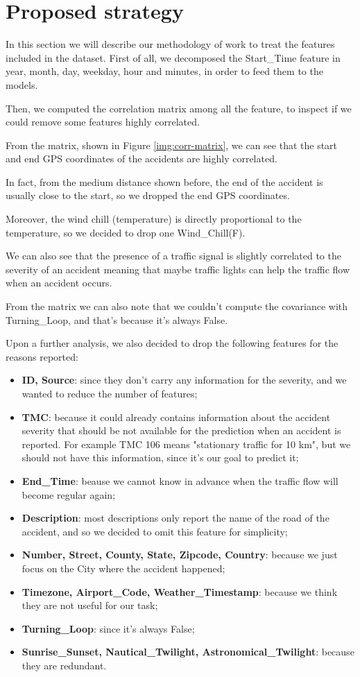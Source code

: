 \documentclass{article}
\begin{document}
\section{Proposed strategy}
In this section we will describe our methodology of work to treat the features included in the dataset.
First of all, we decomposed the Start\_Time feature in year, month, day, weekday, hour and minutes, in order to feed them to the models.

Then, we computed the correlation matrix among all the feature, to inspect if we could remove some features highly correlated.

From the matrix, shown in Figure \ref{img:corr-matrix}, we can see that the start and end GPS coordinates of the accidents are highly correlated.

In fact, from the medium distance shown before, the end of the accident is usually close to the start, so we dropped the end GPS coordinates.

Moreover, the wind chill (temperature) is directly proportional to the temperature, so we decided to drop one Wind\_Chill(F).

We can also see that the presence of a traffic signal is slightly correlated to the severity of an accident meaning that maybe traffic lights can help the traffic flow when an accident occurs.

From the matrix we can also note that we couldn't compute the covariance with Turning\_Loop, and that's because it's always False.

Upon a further analysis, we also decided to drop the following features for the reasons reported:

\begin{itemize}
\item \textbf{ID, Source}: since they don't carry any information for the severity, and we wanted to reduce the number of features;
\item \textbf{TMC}: because it could already contains information about the accident severity that should be not available for the prediction when an accident is reported. For example TMC 106 means "stationary traffic for 10 km", but we should not have this information, since it's our goal to predict it;
\item \textbf{End\_Time}: beause we cannot know in advance when the traffic flow will become regular again;
\item \textbf{Description}: most descriptions only report the name of the road of the accident, and so we decided to omit this feature for simplicity;
\item \textbf{Number, Street, County, State, Zipcode, Country}: because we just focus on the City where the accident happened;
\item \textbf{Timezone, Airport\_Code, Weather\_Timestamp}: because we think they are not useful for our task;
\item \textbf{Turning\_Loop}: since it's always False;
\item \textbf{Sunrise\_Sunset, Nautical\_Twilight, Astronomical\_Twilight}: because they are redundant.
\end{itemize}
\end{document}

